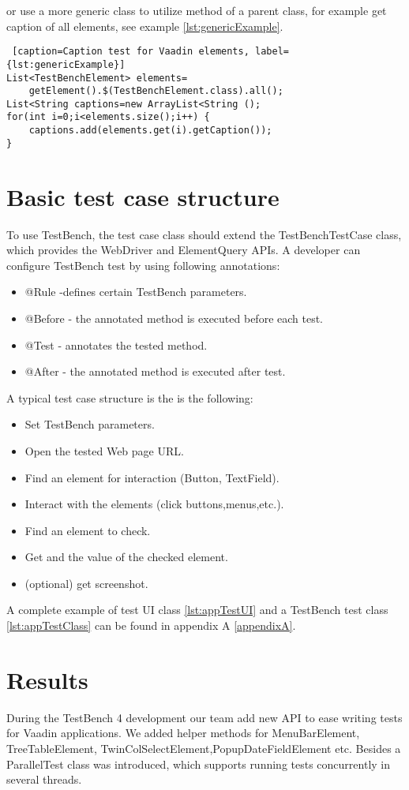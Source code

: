 or use a more generic class to utilize method of a parent class, for example get
caption of all elements, see example \ref{lst:genericExample}.

\lstset{style=a1listing}
\begin{lstlisting} [caption=Caption test for Vaadin elements, label={lst:genericExample}]
List<TestBenchElement> elements=
	getElement().$(TestBenchElement.class).all();
List<String captions=new ArrayList<String ();
for(int i=0;i<elements.size();i++) {
	captions.add(elements.get(i).getCaption());
}
\end{lstlisting}

\section {Basic test case structure}
To use TestBench, the test case class should extend the TestBenchTestCase class,
which provides the WebDriver and ElementQuery APIs. A developer
can configure TestBench test by using following annotations:
\begin{itemize}
  \item @Rule -defines certain TestBench parameters.
  \item @Before - the annotated method is executed before each test.
  \item @Test - annotates the tested method.
  \item @After - the annotated method is executed after test.
\end{itemize}

A typical test case structure is the is the following:
\begin{itemize}
  \item Set TestBench parameters.
  \item Open the tested Web page URL.
  \item Find an element for interaction (Button, TextField).
  \item Interact with the elements (click buttons,menus,etc.).
  \item Find an element to check.
  \item Get and the value of the checked element.
  \item (optional) get screenshot.
\end{itemize}

A complete example of test UI class \ref{lst:appTestUI}  and a TestBench test
class \ref{lst:appTestClass} can be found in appendix A \ref{appendixA}.

\section {Results}
During the TestBench 4 development our team add new API to ease writing tests
for Vaadin applications. We added helper methods for MenuBarElement,
TreeTableElement, TwinColSelectElement,PopupDateFieldElement etc. Besides a
ParallelTest class was introduced, which supports running tests concurrently in
several threads.

